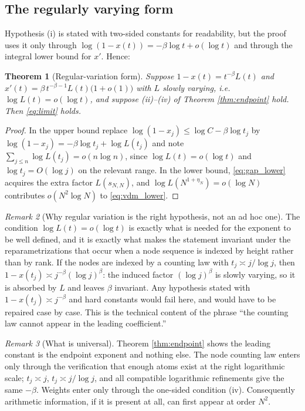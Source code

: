 \documentclass[11pt]{amsart}
\numberwithin{equation}{section}
\theoremstyle{plain}
\newtheorem{theorem}{Theorem}[section]
\theoremstyle{definition}
\theoremstyle{remark}
\newtheorem{remark}[theorem]{Remark}
\begin{document}
\subsection{The regularly varying form}

Hypothesis (i) is stated with two-sided constants for readability, but the proof uses it only
through $\log(1-x(t))=-\beta\log t+o(\log t)$ and through the integral lower bound for $x'$. Hence:

\begin{theorem}[Regular-variation form]
\label{thm:RV}
Suppose $1-x(t)=t^{-\beta}L(t)$ and $x'(t)=\beta\,t^{-\beta-1}L(t)\bigl(1+o(1)\bigr)$ with $L$ slowly
varying, i.e. $\log L(t)=o(\log t)$, and suppose \textup{(ii)--(iv)} of Theorem \ref{thm:endpoint}
hold. Then \eqref{eq:limit} holds.
\end{theorem}

\begin{proof}
In the upper bound replace $\log(1-x_{j})\le\log C-\beta\log t_{j}$ by
$\log(1-x_{j})=-\beta\log t_{j}+\log L(t_{j})$ and note $\sum_{j\le n}\log L(t_{j})=o(n\log n)$,
since $\log L(t)=o(\log t)$ and $\log t_{j}=O(\log j)$ on the relevant range. In the lower bound,
\eqref{eq:gap_lower} acquires the extra factor $L(s_{N,N})$, and
$\log L(N^{1+\eta_{N}})=o(\log N)$ contributes $o(N^{2}\log N)$ to \eqref{eq:vdm_lower}.
\end{proof}

\begin{remark}[Why regular variation is the right hypothesis, not an ad hoc one]
\label{rem:RV}
The condition $\log L(t)=o(\log t)$ is exactly what is needed for the exponent to be well defined,
and it is exactly what makes the statement invariant under the reparametrizations that occur when a
node sequence is indexed by height rather than by rank. If the nodes are indexed by a counting law
with $t_{j}\asymp j/\log j$, then
$1-x(t_{j})\asymp j^{-\beta}(\log j)^{\beta}$: the induced factor $(\log j)^{\beta}$ is slowly
varying, so it is absorbed by $L$ and leaves $\beta$ invariant. Any hypothesis stated with
$1-x(t_{j})\asymp j^{-\beta}$ and hard constants would fail here, and would have to be repaired case
by case. This is the technical content of the phrase ``the counting law cannot appear in the leading
coefficient.''
\end{remark}

\begin{remark}[What is universal]
\label{rem:universal}
Theorem \ref{thm:endpoint} shows the leading constant is the endpoint exponent and nothing else.
The node counting law enters only through the verification that enough atoms exist at the right
logarithmic scale; $t_{j}\asymp j$, $t_{j}\asymp j/\log j$, and all compatible logarithmic
refinements give the same $-\beta$. Weights enter only through the one-sided condition (iv).
Consequently arithmetic information, if it is present at all, can first appear at order $N^{2}$.
\end{remark}
\end{document}
